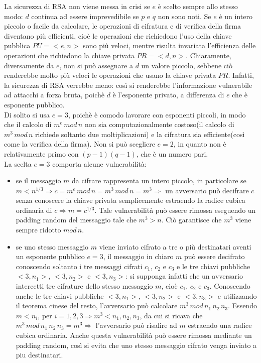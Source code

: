 La sicurezza di RSA non viene messa in crisi se $e$ è scelto sempre allo stesso modo: $d$ continua ad essere imprevedibile se $p$ e $q$ non sono noti. Se $e$ è un intero piccolo o facile da calcolare, le
operazioni di cifratura e di verifica della firma diventano più efficienti, cioè le operazioni che richiedono l'uso della chiave pubblica $PU = <e,n>$ sono più veloci, mentre risulta invariata l'efficienza delle operazioni che richiedono la chiave privata $PR = <d,n>$. Chiaramente, diversamente da $e$, non si può assegnare
a $d$ un valore piccolo, sebbene ciò renderebbe molto più veloci le operazioni che usano la chiave privata $PR$. Infatti, la sicurezza di RSA verrebbe meno: così si renderebbe l'informazione vulnerabile ad attacchi a forza bruta, poichè $d$ è l'esponente privato, a differenza di $e$ che è esponente pubblico.
\\ Di solito si usa $e=3$, poichè è comodo lavorare con esponenti piccoli, in modo che il calcolo di $m^e \, mod \, n$ non sia computazionalmente costoso(il calcolo di $ m^3 \, mod \, n$ richiede soltanto due moltiplicazioni) e la cifratura sia efficiente(così come la verifica della firma). Non si può scegliere $e=2$, in quanto non è relativamente primo con $(p-1)(q-1)$, che è un numero pari. \\
La scelta $e=3$ comporta alcune vulnerabilità: \begin{itemize}
\item se il messaggio $m$ da cifrare rappresenta un intero piccolo, in particolare se $m < n^{1/3} \Rightarrow  c = m^e \, mod \, n = m^3 \, mod \, n = m^3 \Rightarrow$ un avversario può decifrare $c$ senza conoscere la chiave privata semplicemente estraendo la radice
cubica ordinaria di $c \Rightarrow m = c^{1/3}$. Tale vulnerabilità può essere rimossa eseguendo un padding random del messaggio tale che $m^3 > n$. Ciò garantisce che $m^3$ viene sempre ridotto $ mod \, n $.
\item se uno stesso messaggio $m$ viene inviato cifrato a tre o più destinatari aventi un esponente pubblico $e=3$, il messaggio in chiaro $m$ può essere decifrato conoscendo soltanto i tre messaggi cifrati $c_{1}$, $c_{2}$ e $c_{3}$ e le tre chiavi pubbliche $<3,n_{1}>$, $<3,n_{2}>$ e $<3,n_{3}>$: si supponga infatti che un avversario intercetti tre cifrature dello stesso messaggio $m$, cioè $c_{1}$, $c_{2}$ e $c_{3}$. Conoscendo anche le tre chiavi pubbliche $<3,n_{1}>$, $<3,n_{2}>$ e $<3,n_{3}>$ e utilizzando il teorema cinese del resto, l'avversario può calcolare  $m^3 \, mod \, n_{1} \, n_{2} \, n_{3}$. Essendo $m<n_{i}$, per $i=1,2,3 \Rightarrow m^3<n_{1},n_{2},n_{3}$, da cui si ricava che $m^3 \, mod \, n_{1} \, n_{2} \, n_{3} = m^3 \Rightarrow$ l'avversario può risalire ad $m$ estraendo una radice cubica ordinaria. Anche questa vulnerabilità può essere rimossa mediante un padding random, così si evita che uno stesso messaggio cifrato venga inviato a piu destinatari. 
\end{itemize}

